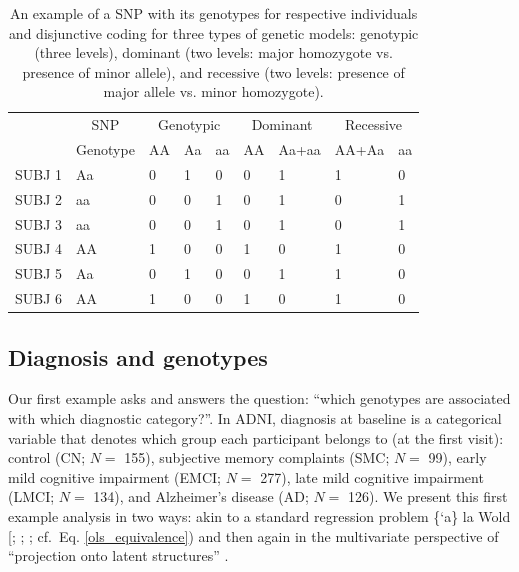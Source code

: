 \documentclass[12pt]{article}
\begin{document}
\begin{table}[!h]

\caption{\label{tab:unnamed-chunk-2}\label{table:snps_models_disj} An example of a SNP with its genotypes for respective individuals and disjunctive coding for three types of genetic models: genotypic (three levels), dominant (two levels: major homozygote vs. presence of minor allele), and recessive (two levels: presence of major allele vs. minor homozygote).}
\centering
\begin{tabular}[t]{lllllllll}
\toprule
\multicolumn{1}{c}{ } & \multicolumn{1}{c}{SNP} & \multicolumn{3}{c}{Genotypic} & \multicolumn{2}{c}{Dominant} & \multicolumn{2}{c}{Recessive} \\
\cmidrule(l{3pt}r{3pt}){2-2} \cmidrule(l{3pt}r{3pt}){3-5} \cmidrule(l{3pt}r{3pt}){6-7} \cmidrule(l{3pt}r{3pt}){8-9}
  & Genotype & AA & Aa & aa & AA & Aa+aa & AA+Aa & aa\\
\midrule
SUBJ 1 & Aa & 0 & 1 & 0 & 0 & 1 & 1 & 0\\
SUBJ 2 & aa & 0 & 0 & 1 & 0 & 1 & 0 & 1\\
SUBJ 3 & aa & 0 & 0 & 1 & 0 & 1 & 0 & 1\\
SUBJ 4 & AA & 1 & 0 & 0 & 1 & 0 & 1 & 0\\
SUBJ 5 & Aa & 0 & 1 & 0 & 0 & 1 & 1 & 0\\
\addlinespace
SUBJ 6 & AA & 1 & 0 & 0 & 1 & 0 & 1 & 0\\
\bottomrule
\end{tabular}
\end{table}

\hypertarget{diagnosis-and-genotypes}{%
\subsection{Diagnosis and genotypes}\label{diagnosis-and-genotypes}}

\label{section:plscarda}

Our first example asks and answers the question: ``which genotypes are
associated with which diagnostic category?''. In ADNI, diagnosis at
baseline is a categorical variable that denotes which group each
participant belongs to (at the first visit): control (CN; \(N=\) 155),
subjective memory complaints (SMC; \(N=\) 99), early mild cognitive
impairment (EMCI; \(N=\) 277), late mild cognitive impairment (LMCI;
\(N=\) 134), and Alzheimer's disease (AD; \(N=\) 126). We present this
first example analysis in two ways: akin to a standard regression
problem \{`a\} la Wold {[}\citet{wold1975soft};
\citet{wold_collinearity_1984}; \citet{wold_principal_1987}; cf.~Eq.
\ref{ols_equivalence}) and then again in the multivariate perspective of
``projection onto latent structures'' \citep{abdi_partial_2010-1}.
\end{document}
